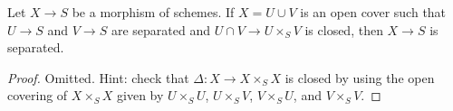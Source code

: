 
\begin{lemma}
\label{lemma-check-separated}
Let $X \to S$ be a morphism of schemes. If $X = U \cup V$
is an open cover such that $U \to S$ and $V \to S$ are separated
and $U \cap V \to U \times_S V$ is closed, then
$X \to S$ is separated.
\end{lemma}

\begin{proof}
Omitted. Hint: check that $\Delta : X \to X \times_S X$ is
closed by using the open covering of $X \times_S X$ given by
$U \times_S U$, $U \times_S V$, $V \times_S U$, and $V \times_S V$.
\end{proof}
